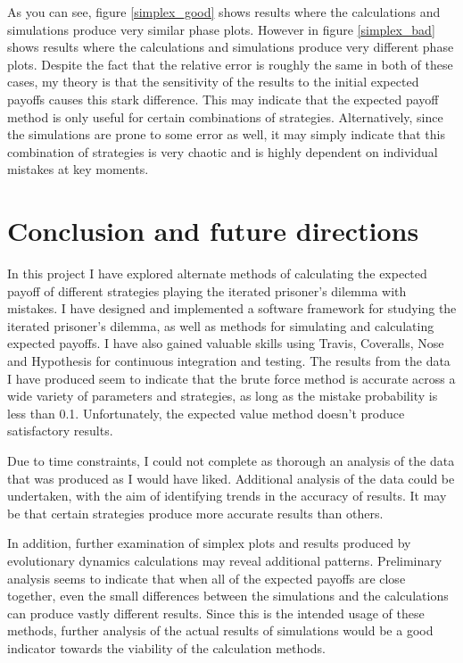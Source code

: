 \documentclass[a4paper,12pt]{article}
\begin{document}
\begin{figure}
\end{figure}

As you can see, figure \ref{simplex_good} shows results where the calculations and simulations produce very similar phase plots.
However in figure \ref{simplex_bad} shows results where the calculations and simulations produce very different phase plots.
Despite the fact that the relative error is roughly the same in both of these cases, my theory is that the sensitivity of the results to the initial expected payoffs causes this stark difference.
This may indicate that the expected payoff method is only useful for certain combinations of strategies.
Alternatively, since the simulations are prone to some error as well, it may simply indicate that this combination of strategies is very chaotic and is highly dependent on individual mistakes at key moments.

\section{Conclusion and future directions}

In this project I have explored alternate methods of calculating the expected payoff of different strategies playing the iterated prisoner's dilemma with mistakes.
I have designed and implemented a software framework for studying the iterated prisoner's dilemma, as well as methods for simulating and calculating expected payoffs.
I have also gained valuable skills using Travis, Coveralls, Nose and Hypothesis for continuous integration and testing.
The results from the data I have produced seem to indicate that the brute force method is accurate across a wide variety of parameters and strategies, as long as the mistake probability is less than 0.1.
Unfortunately, the expected value method doesn't produce satisfactory results.

Due to time constraints, I could not complete as thorough an analysis of the data that was produced as I would have liked.
Additional analysis of the data could be undertaken, with the aim of identifying trends in the accuracy of results.
It may be that certain strategies produce more accurate results than others.

In addition, further examination of simplex plots and results produced by evolutionary dynamics calculations may reveal additional patterns.
Preliminary analysis seems to indicate that when all of the expected payoffs are close together, even the small differences between the simulations and the calculations can produce vastly different results.
Since this is the intended usage of these methods, further analysis of the actual results of simulations would be a good indicator towards the viability of the calculation methods.
\end{document}
